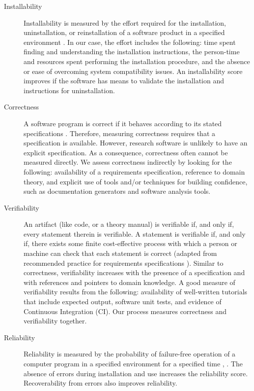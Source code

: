 \documentclass[final, 3p, times, authoryear]{elsarticle}
\begin{document}
\begin{description}

	\item[Installability] Installability is measured by the effort required for
	the installation, uninstallation, or reinstallation of a software product in
	a specified environment \citep{ISO/IEC25010, lenhard2013measuring}. In our
	case, the effort includes the following: time spent finding and
	understanding the installation instructions, the person-time and resources
	spent performing the installation procedure, and the absence or ease of
	overcoming system compatibility issues. An installability score improves if
	the software has means to validate the installation and instructions for
	uninstallation.
	
	\item[Correctness] A software program is correct if it behaves according to
	its stated specifications \citep[p.\ 17]{GhezziEtAl2003}. Therefore,
	measuring correctness requires that a specification is available. However,
	research software is unlikely to have an explicit specification. As a
	consequence, correctness often cannot be measured directly. We assess
	correctness indirectly by looking for the following: availability of a
	requirements specification, reference to domain theory, and explicit use of
	tools and/or techniques for building confidence, such as documentation
	generators and software analysis tools.
	
	\item[Verifiability] An artifact (like code, or a theory manual) is
	verifiable if, and only if, every statement therein is verifiable. A
	statement is verifiable if, and only if, there exists some finite
	cost-effective process with which a person or machine can check that each
	statement is correct (adapted from recommended practice for requirements
	specifications \citep{IEEE1998}). Similar to correctness, verifiability
	increases with the presence of a specification and with references and
	pointers to domain knowledge. A good measure of verifiability results from
	the following: availability of well-written tutorials that include expected
	output, software unit tests, and evidence of Continuous Integration (CI).
	Our process measures correctness and verifiability together.
	
	\item[Reliability] Reliability is measured by the probability of
	failure-free operation of a computer program in a specified environment for
	a specified time \citep[p.\ 357]{GhezziEtAl2003}, \citep{musa1987software}.
	The absence of errors during installation and use increases the reliability
	score. Recoverability from errors also improves reliability.
	

\end{description}
\end{document}
